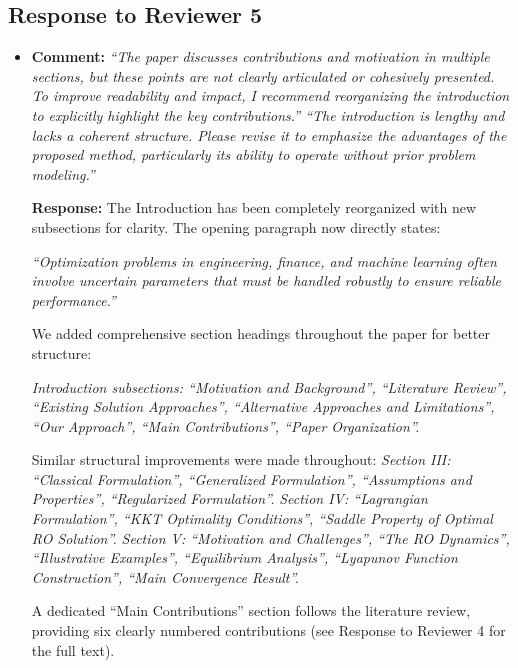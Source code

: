 \documentclass[journal,twoside,web]{ieeecolor}
\begin{document}
\newpage 
\subsection*{Response to Reviewer 5}

\begin{itemize}
\item \textbf{Comment:} \textit{``The paper discusses contributions and motivation in multiple sections, but these points are not clearly articulated or cohesively presented. To improve readability and impact, I recommend reorganizing the introduction to explicitly highlight the key contributions.'' ``The introduction is lengthy and lacks a coherent structure. Please revise it to emphasize the advantages of the proposed method, particularly its ability to operate without prior problem modeling.''}

\textbf{Response:} The Introduction has been completely reorganized with new subsections for clarity. The opening paragraph now directly states: 

{\color{revisionblue}\textit{``Optimization problems in engineering, finance, and machine learning often involve uncertain parameters that must be handled robustly to ensure reliable performance.''}}

We added comprehensive section headings throughout the paper for better structure:

{\color{revisionblue}\textit{Introduction subsections: ``Motivation and Background'', ``Literature Review'', ``Existing Solution Approaches'', ``Alternative Approaches and Limitations'', ``Our Approach'', ``Main Contributions'', ``Paper Organization''.}}

Similar structural improvements were made throughout:
{\color{revisionblue}\textit{Section III: ``Classical Formulation'', ``Generalized Formulation'', ``Assumptions and Properties'', ``Regularized Formulation''.}}
{\color{revisionblue}\textit{Section IV: ``Lagrangian Formulation'', ``KKT Optimality Conditions'', ``Saddle Property of Optimal RO Solution''.}}
{\color{revisionblue}\textit{Section V: ``Motivation and Challenges'', ``The RO Dynamics'', ``Illustrative Examples'', ``Equilibrium Analysis'', ``Lyapunov Function Construction'', ``Main Convergence Result''.}}

A dedicated ``Main Contributions'' section follows the literature review, providing six clearly numbered contributions (see Response to Reviewer 4 for the full text).\\


\end{itemize}
\end{document}
